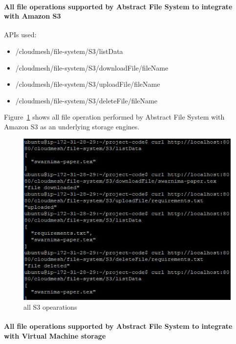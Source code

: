 \paragraph{All file operations supported by Abstract File System to integrate 
with Amazon S3}


APIs used:


\begin{itemize}
    \item /cloudmesh/file-system/S3/listData
    \item /cloudmesh/file-system/S3/downloadFile/{fileName}
    \item /cloudmesh/file-system/S3/uploadFile/{fileName}
    \item /cloudmesh/file-system/S3/deleteFile/{fileName}
\end{itemize}

Figure~\ref{fig:all-s3} shows all file operation performed by 
Abstract File System with Amazon S3 as an underlying storage engines. 

\begin{figure}[!ht]
        \centering\includegraphics[width=\columnwidth]
        {image/all-s3.JPG}
        \caption{all S3 opearations}\label{fig:all-s3}
\end{figure}


\paragraph{All file operations supported by Abstract File System to integrate 
with Virtual Machine storage}


